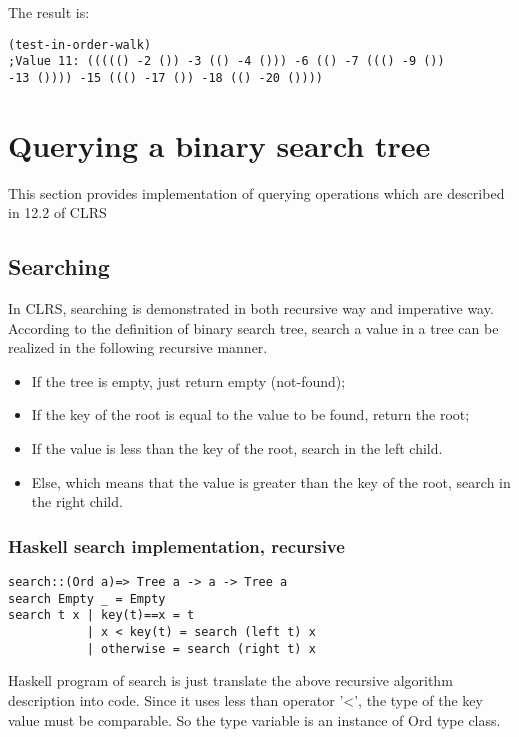 \documentclass{article}
\begin{document}
The result is:

\begin{verbatim}
(test-in-order-walk)
;Value 11: ((((() -2 ()) -3 (() -4 ())) -6 (() -7 ((() -9 ()) 
-13 ()))) -15 ((() -17 ()) -18 (() -20 ())))
\end{verbatim}

\section{Querying a binary search tree}

This section provides implementation of querying operations which are
described in 12.2 of CLRS\cite{CLRS}

\subsection{Searching}
In CLRS\cite{CLRS}, searching is demonstrated in both recursive way and 
imperative way. According to the definition of binary search tree, search
a value in a tree can be realized in the following recursive manner.

\begin{itemize}
\item If the tree is empty, just return empty (not-found);
\item If the key of the root is equal to the value to be found, 
return the root;
\item If the value is less than the key of the root, search in the left
child.
\item Else, which means that the value is greater than the key of the 
root, search in the right child.
\end{itemize}

\subsubsection*{Haskell search implementation, recursive}
\lstset{language=Haskell}
\begin{lstlisting}
search::(Ord a)=> Tree a -> a -> Tree a
search Empty _ = Empty
search t x | key(t)==x = t
           | x < key(t) = search (left t) x
           | otherwise = search (right t) x
\end{lstlisting}

Haskell program of search is just translate the above recursive algorithm
description into code. Since it uses less than operator '<', the type
of the key value must be comparable. So the type variable is an instance 
of Ord type class.
\end{document}
